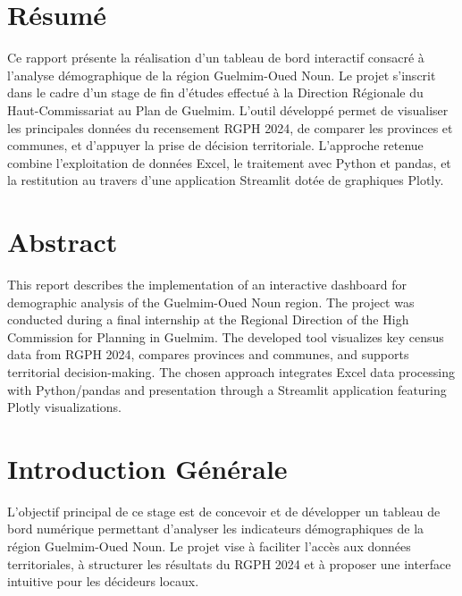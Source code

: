 \documentclass[12pt,a4paper,oneside]{report}
\begin{document}
\chapter*{Résumé}
Ce rapport présente la réalisation d'un tableau de bord interactif consacré à l'analyse démographique de la région Guelmim-Oued Noun. Le projet s'inscrit dans le cadre d'un stage de fin d'études effectué à la Direction Régionale du Haut-Commissariat au Plan de Guelmim. L'outil développé permet de visualiser les principales données du recensement RGPH 2024, de comparer les provinces et communes, et d'appuyer la prise de décision territoriale. L'approche retenue combine l'exploitation de données Excel, le traitement avec Python et pandas, et la restitution au travers d'une application Streamlit dotée de graphiques Plotly.

\chapter*{Abstract}
This report describes the implementation of an interactive dashboard for demographic analysis of the Guelmim-Oued Noun region. The project was conducted during a final internship at the Regional Direction of the High Commission for Planning in Guelmim. The developed tool visualizes key census data from RGPH 2024, compares provinces and communes, and supports territorial decision-making. The chosen approach integrates Excel data processing with Python/pandas and presentation through a Streamlit application featuring Plotly visualizations.

\newpage
\tableofcontents

\newpage
\listoffigures

\newpage
\listoftables

\newpage
\printnomenclature

\clearpage
{}

\chapter{Introduction Générale}

L'objectif principal de ce stage est de concevoir et de développer un tableau de bord numérique permettant d'analyser les indicateurs démographiques de la région Guelmim-Oued Noun. Le projet vise à faciliter l'accès aux données territoriales, à structurer les résultats du RGPH 2024 et à proposer une interface intuitive pour les décideurs locaux.
\end{document}
